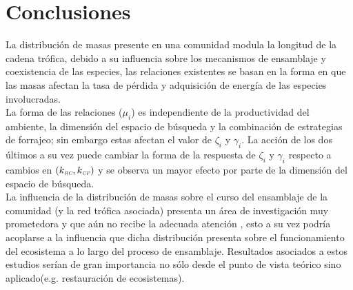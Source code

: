 \section{Conclusiones}

La distribuci\'on de masas presente en una comunidad modula la longitud de la cadena tr\'ofica, debido a su influencia sobre los mecanismos de ensamblaje y coexistencia de las especies, las relaciones existentes se basan en la forma en que las masas afectan la tasa de p\'erdida y adquisici\'on de energ\'ia de las especies involucradas.\\
La forma de las relaciones ($\mu_i$) es independiente de la productividad del ambiente, la dimensi\'on del espacio de b\'usqueda y la combinaci\'on de estrategias de forrajeo; sin embargo estas afectan el valor de $\zeta_i$ y $\gamma_i$. La acci\'on de los dos \'ultimos a su vez puede cambiar la forma de la respuesta de $\zeta_i$ y $\gamma_i$ respecto a cambios en $(k_{\textit{\tiny RC}},k_{\textit{\tiny CP}})$ y se observa un mayor efecto por parte de la dimensi\'on del espacio de b\'usqueda.\\
La influencia de la distribuci\'on de masas sobre el curso del ensamblaje de la comunidad (y la red tr\'ofica asociada) presenta un \'area de investigaci\'on muy prometedora y que a\'un no recibe la adecuada atenci\'on , esto a su vez podr\'ia acoplarse a la influencia que dicha distribuci\'on presenta sobre el funcionamiento del ecosistema a lo largo del proceso de ensamblaje. Resultados asociados a estos estudios ser\'ian de gran importancia no s\'olo desde el punto de vista te\'orico sino aplicado(e.g. restauraci\'on de ecosistemas).











